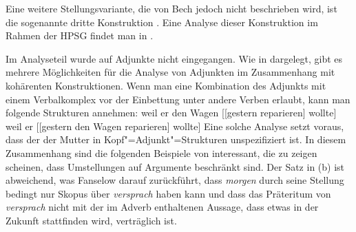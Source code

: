 {{Eine weitere Stellungsvariante, die von Bech jedoch nicht beschrieben wird, ist die sogenannte
dritte Konstruktion \citep*{dBR89}. Eine Analyse dieser Konstruktion im
Rahmen der HPSG findet man in .

Im 
Analyseteil wurde auf Adjunkte nicht eingegangen. Wie in  dargelegt, gibt es
mehrere Möglichkeiten für die Analyse von Adjunkten im Zusammenhang mit kohärenten
Konstruktionen. Wenn man eine Kombination des Adjunkts mit einem Verbalkomplex vor der Einbettung
unter andere Verben erlaubt, kann man folgende Strukturen annehmen:
\eal
\label{anal-adjunct-VP-Einbettung}
\ex weil er den Wagen [[gestern reparieren] wollte]
\ex weil er [[gestern den Wagen reparieren] wollte]
\zl
Eine solche Analyse setzt voraus, dass der \lexw der Mutter in Kopf"=Adjunkt"=Strukturen
unspezifiziert ist. In diesem Zusammenhang sind die folgenden Beispiele von \citet[]{Fanselow2001a} interessant, die zu zeigen scheinen, dass Umstellungen auf Argumente beschränkt
sind.
\eal
\label{bsp-adjunkte-in-kohaerenten-konstr}
\zl
Der Satz in (b) ist abweichend, was Fanselow darauf zurückführt, dass \emph{morgen}
durch seine Stellung bedingt nur Skopus über \emph{versprach} haben kann und dass das
Präteritum von \emph{versprach} nicht mit der im Adverb enthaltenen Aussage, dass etwas in
der Zukunft stattfinden wird, verträglich ist.

}}
